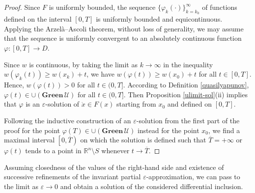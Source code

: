 \documentclass[a4paper]{article}
\begin{document}
\begin{proof}
    Since $F$ is uniformly bounded, the sequence $\{\varphi_k(\cdot)\}_{k=k_0}^{\infty}$ of functions defined on the interval $[0,T]$ is uniformly bounded and equicontinuous. Applying the Arzelà–Ascoli theorem, without loss of generality, we may assume that the sequence is uniformly convergent to an absolutely continuous function $\varphi : [0,T] \to D$.

    Since $w$ is continuous, by taking the limit as $k \to \infty$ in the inequality $w(\varphi_k(t)) \ge w(x_k) + t$, we have $w(\varphi(t)) \ge w(x_0) + t$ for all $t \in [0,T]$. Hence, $w(\varphi(t)) > 0$ for all $t \in (0,T]$. According to Definition \ref{quasilyapunov}, $\varphi(t) \in \cup(\mathbf{Green} \,\mathcal{U})$ for all $t \in (0,T]$. Then Proposition \ref{ulimit-sol}(ii) implies that $\varphi$ is an $\varepsilon$-solution of $\dot{x} \in F(x)$ starting from $x_0$ and defined on $[0,T]$.

    Following the inductive construction of an $\varepsilon$-solution from the first part of the proof for the point $\varphi(T) \in \cup(\mathbf{Green} \,\mathcal{U})$ instead for the point $x_0$, we find a maximal interval $\left[0,\overline{T}\right)$ on which the solution is defined such that $\overline{T}=+\infty$ or $\varphi(t)$ tends to a point in $\mathbb{R}^n \setminus S$ whenever $t \to \overline{T}$.
\end{proof}

Assuming closedness of the values of the right-hand side and existence of successive refinements of the invariant partial $\varepsilon$-approximation, we can pass to the limit as $\varepsilon \to 0$ and obtain a solution of the considered differential inclusion.
\end{document}
